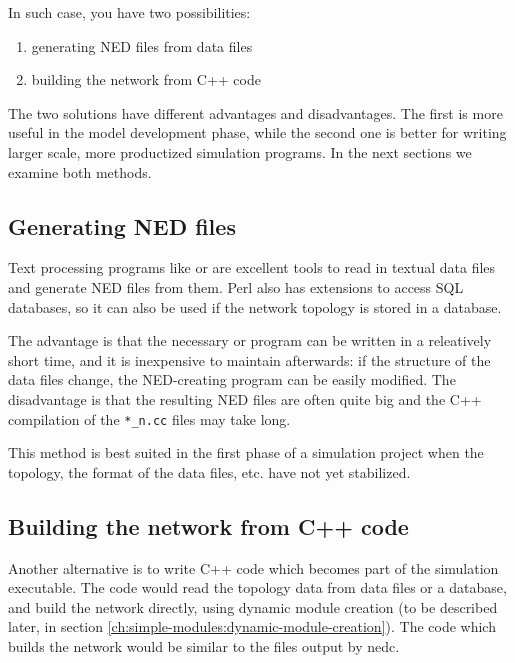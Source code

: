 In such case, you have two possibilities:

\begin{enumerate}
  \item{generating NED files from data files}
  \item{building the network from C++ code}
\end{enumerate}

The two solutions have different advantages and disadvantages.
The first is more useful in the model development phase, while
the second one is better for writing larger scale, more productized
simulation programs. In the next sections we examine both methods.



\subsection{Generating NED files}


Text processing programs like  or  are
excellent tools to read in textual data files and generate NED files
from them.  Perl also has extensions to
access SQL databases, so it can also be used if the network topology
is stored in a database.

The advantage is that the necessary  or 
program can be written in a releatively short time, and it is
inexpensive to maintain afterwards: if the structure of the data files
change, the NED-creating program can be easily modified. The
disadvantage is that the resulting NED files are often quite big and
the C++ compilation of the \texttt{*\_n.cc} files may take long.

This method is best suited in the first phase of a simulation
project when the topology, the format of the data files, etc.
have not yet stabilized.



\subsection{Building the network from C++ code}

Another alternative is to write C++ code which becomes part of the
simulation executable. The code would read the topology data from data
files or a database, and build the network directly, using
dynamic module creation (to be described later, in section
\ref{ch:simple-modules:dynamic-module-creation}).
The code which builds the network would be similar to the 
files output by nedc.

